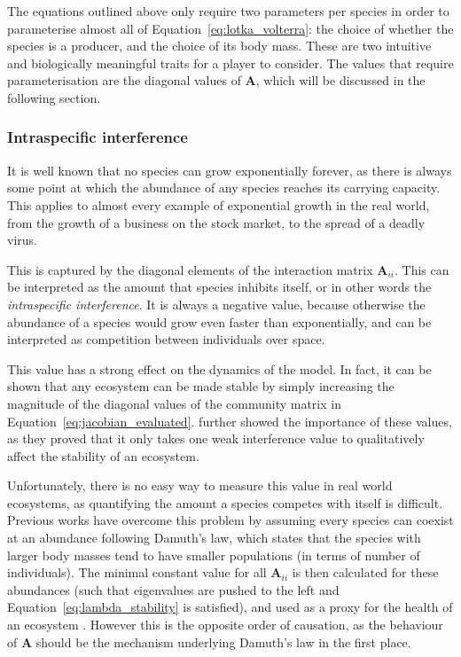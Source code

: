 The equations outlined above only require two parameters per species in order to parameterise almost all of Equation~\eqref{eq:lotka_volterra}: the choice of whether the species is a producer, and the choice of its body mass. These are two intuitive and biologically meaningful traits for a player to consider.
The values that require parameterisation are the diagonal values of $\mathbf{A}$, which will be discussed in the following section.

\subsubsection{Intraspecific interference}
It is well known that no species can grow exponentially forever, as there is always some point at which the abundance of any species reaches its carrying capacity. 
This applies to almost every example of exponential growth in the real world, from the growth of a business on the stock market, to the spread of a deadly virus.

This is captured by the diagonal elements of the interaction matrix $\mathbf{A}_{ii}$. This can be interpreted as the amount that species inhibits itself, or in other words the \emph{intraspecific interference}. It is always a negative value, because otherwise the abundance of a species would grow even faster than exponentially, and can be interpreted as competition between individuals over space.

This value has a strong effect on the dynamics of the model. In fact, it can be shown that any ecosystem can be made stable by simply increasing the magnitude of the diagonal values of the community matrix in Equation~\eqref{eq:jacobian_evaluated}. 
\citet{Barabas2017} further showed the importance of these values, as they proved that it only takes one weak interference value to qualitatively affect the stability of an ecosystem.

Unfortunately, there is no easy way to measure this value in real world ecosystems, as quantifying the amount a species competes with itself is difficult. Previous works have overcome this problem by assuming every species can coexist at an abundance following Damuth's law, which states that the species with larger body masses tend to have smaller populations (in terms of number of individuals). The minimal constant value for all $\mathbf{A}_{ii}$ is then calculated for these abundances (such that eigenvalues are pushed to the left and Equation~\eqref{eq:lambda_stability} is satisfied), and used as a proxy for the health of an ecosystem \citep{Tang2014Correlation, Pawar2015}. However this is the opposite order of causation, as the behaviour of $\mathbf{A}$ should be the mechanism underlying Damuth's law in the first place.

